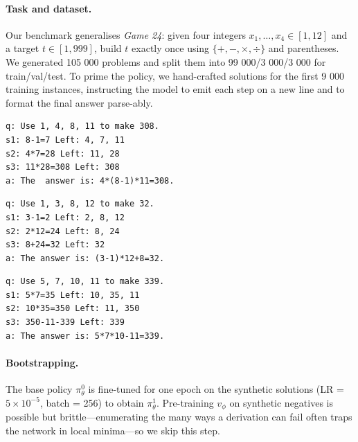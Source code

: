 \documentclass{article}
\begin{document}
\paragraph{Task and dataset.}
Our benchmark generalises \emph{Game 24}:
given four integers $x_1,\dots,x_4\!\in\![1,12]$
and a target $t\!\in\![1,999]$, build $t$ exactly once using
$\{+,-,\times,\div\}$ and parentheses.
We generated 105 000 problems and split them into
99 000/3 000/3 000 for train/val/test.
To prime the policy, we hand-crafted solutions for the first 9 000
training instances, instructing the model to emit each step on a new
line and to format the final answer parse-ably.

\noindent
\begin{minipage}[t]{0.32\textwidth}
\scriptsize\begin{verbatim}
q: Use 1, 4, 8, 11 to make 308.
s1: 8-1=7 Left: 4, 7, 11
s2: 4*7=28 Left: 11, 28
s3: 11*28=308 Left: 308
a: The  answer is: 4*(8-1)*11=308.
\end{verbatim}
\end{minipage}
\hfill
\begin{minipage}[t]{0.32\textwidth}
\scriptsize\begin{verbatim}
q: Use 1, 3, 8, 12 to make 32.
s1: 3-1=2 Left: 2, 8, 12
s2: 2*12=24 Left: 8, 24
s3: 8+24=32 Left: 32
a: The answer is: (3-1)*12+8=32.
\end{verbatim}
\end{minipage}
\hfill
\begin{minipage}[t]{0.32\textwidth}
\scriptsize\begin{verbatim}
q: Use 5, 7, 10, 11 to make 339.
s1: 5*7=35 Left: 10, 35, 11
s2: 10*35=350 Left: 11, 350
s3: 350-11-339 Left: 339
a: The answer is: 5*7*10-11=339.
\end{verbatim}
\end{minipage}
\newline

\paragraph{Bootstrapping.}
The base policy $\pi_\theta^0$ is fine-tuned for one epoch on the
synthetic solutions (LR = $5\!\times\!10^{-5}$, batch = 256) to obtain
$\pi_\theta^1$.
Pre-training $v_\phi$ on synthetic negatives is
possible but brittle—enumerating the many ways a derivation can fail
often traps the network in local minima—so we skip this step.
\end{document}
